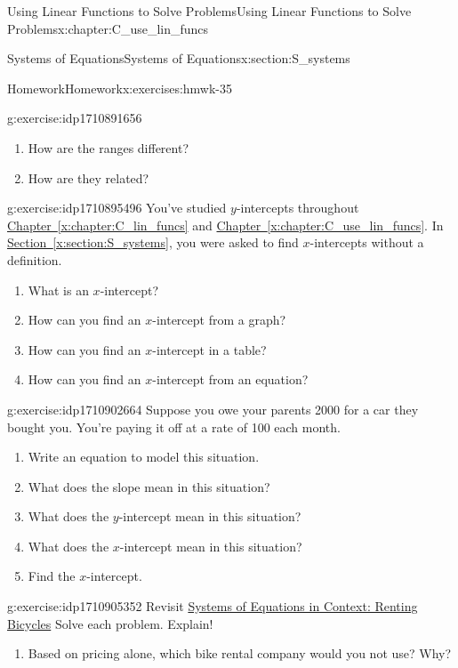 \documentclass[oneside,10pt,]{book}
\newcommand{\xreffont}{\relax}
\numberwithin{equation}{chapter}
\begin{document}
\begin{chapterptx}{Using Linear Functions to Solve Problems}{}{Using Linear Functions to Solve Problems}{}{}{x:chapter:C_use_lin_funcs}
\begin{sectionptx}{Systems of Equations}{}{Systems of Equations}{}{}{x:section:S_systems}
\begin{exercises-subsection}{Homework}{}{Homework}{}{}{x:exercises:hmwk-35}
\begin{divisionexercise}{5}{}{}{g:exercise:idp1710891656}
\begin{enumerate}[font=\bfseries,label=(\alph*),ref=\alph*]
\item{}How are the ranges different?%
\item{}How are they related?%
\end{enumerate}
\end{divisionexercise}%
\begin{divisionexercise}{6}{}{}{g:exercise:idp1710895496}%
You've studied \(y\)-intercepts throughout \hyperref[x:chapter:C_lin_funcs]{Chapter~{\xreffont\ref{x:chapter:C_lin_funcs}}} and \hyperref[x:chapter:C_use_lin_funcs]{Chapter~{\xreffont\ref{x:chapter:C_use_lin_funcs}}}. In \hyperref[x:section:S_systems]{Section~{\xreffont\ref{x:section:S_systems}}}, you were asked to find \(x\)-intercepts without a definition.%
\begin{enumerate}[font=\bfseries,label=(\alph*),ref=\alph*]
\item{}What is an \(x\)-intercept?%
\item{}How can you find an \(x\)-intercept from a graph?%
\item{}How can you find an \(x\)-intercept in a table?%
\item{}How can you find an \(x\)-intercept from an equation?%
\end{enumerate}
\end{divisionexercise}%
\begin{divisionexercise}{7}{}{}{g:exercise:idp1710902664}%
Suppose you owe your parents \textdollar{}2000 for a car they bought you. You're paying it off at a rate of \textdollar{}100 each month.%
\begin{enumerate}[font=\bfseries,label=(\alph*),ref=\alph*]
\item{}Write an equation to model this situation.%
\item{}What does the slope mean in this situation?%
\item{}What does the \(y\)-intercept mean in this situation?%
\item{}What does the \(x\)-intercept mean in this situation?%
\item{}Find the \(x\)-intercept.%
\end{enumerate}
\end{divisionexercise}%
\begin{divisionexercise}{8}{}{}{g:exercise:idp1710905352}%
Revisit \hyperref[x:worksheet:act-rent-bikes]{Systems of Equations in Context: Renting Bicycles} Solve each problem. Explain!%
\begin{enumerate}[font=\bfseries,label=(\alph*),ref=\alph*]
\item{}Based on pricing alone, which bike rental company would you not use? Why?%

\end{enumerate}
\end{divisionexercise}
\end{exercises-subsection}
\end{sectionptx}
\end{chapterptx}
\end{document}
